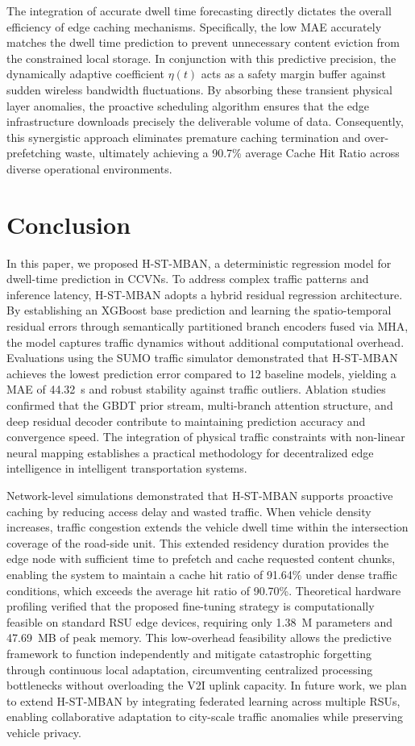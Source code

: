 \documentclass[journal]{IEEEtran}
\begin{document}
The integration of accurate dwell time forecasting directly dictates the overall efficiency of edge caching mechanisms. Specifically, the low MAE accurately matches the dwell time prediction to prevent unnecessary content eviction from the constrained local storage. In conjunction with this predictive precision, the dynamically adaptive coefficient $\eta(t)$ acts as a safety margin buffer against sudden wireless bandwidth fluctuations. By absorbing these transient physical layer anomalies, the proactive scheduling algorithm ensures that the edge infrastructure downloads precisely the deliverable volume of data. Consequently, this synergistic approach eliminates premature caching termination and over-prefetching waste, ultimately achieving a 90.7\% average Cache Hit Ratio across diverse operational environments.
\section{Conclusion} \label{sec:conclusion}
In this paper, we proposed H-ST-MBAN, a deterministic regression model for dwell-time prediction in CCVNs.
To address complex traffic patterns and inference latency, H-ST-MBAN adopts a hybrid residual regression architecture.
By establishing an XGBoost base prediction and learning the spatio-temporal residual errors through semantically partitioned branch encoders fused via MHA, the model captures traffic dynamics without additional computational overhead.
Evaluations using the SUMO traffic simulator demonstrated that H-ST-MBAN achieves the lowest prediction error compared to 12 baseline models, yielding a MAE of 44.32~s and robust stability against traffic outliers.
Ablation studies confirmed that the GBDT prior stream, multi-branch attention structure, and deep residual decoder contribute to maintaining prediction accuracy and convergence speed.
The integration of physical traffic constraints with non-linear neural mapping establishes a practical methodology for decentralized edge intelligence in intelligent transportation systems.

Network-level simulations demonstrated that H-ST-MBAN supports proactive caching by reducing access delay and wasted traffic.
When vehicle density increases, traffic congestion extends the vehicle dwell time within the intersection coverage of the road-side unit.
This extended residency duration provides the edge node with sufficient time to prefetch and cache requested content chunks, enabling the system to maintain a cache hit ratio of 91.64\% under dense traffic conditions, which exceeds the average hit ratio of 90.70\%.
Theoretical hardware profiling verified that the proposed fine-tuning strategy is computationally feasible on standard RSU edge devices, requiring only 1.38~M parameters and 47.69~MB of peak memory.
This low-overhead feasibility allows the predictive framework to function independently and mitigate catastrophic forgetting through continuous local adaptation, circumventing centralized processing bottlenecks without overloading the V2I uplink capacity.
In future work, we plan to extend H-ST-MBAN by integrating federated learning across multiple RSUs, enabling collaborative adaptation to city-scale traffic anomalies while preserving vehicle privacy.
\end{document}
